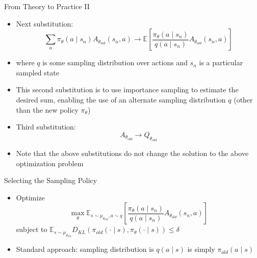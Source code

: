 \documentclass[aspectratio=169]{../latex_main/tntbeamer}  %
\begin{document}
\begin{frame}[c]{From Theory to Practice II}
	
    \begin{itemize}
        \item Next substitution:
        $$\sum_{a} \pi_\theta (a\mid s_n) A_{\theta_{old}} (s_n, a) \to \mathbb{E}\left[ \frac{\pi_\theta(a \mid s_n)}{q(a\mid s_n)} A_{\theta_{old}} (s_n, a) \right] $$
        \item where $q$ is some sampling distribution over actions and $s_n$ is a particular sampled state
        \item This second substitution is to use \alert{importance sampling} to estimate the desired sum, enabling the use of an alternate sampling distribution $q$ (other than the new policy $\pi_\theta$)
        \pause
        \item Third substitution:
        $$ A_{\theta_{old}} \to Q_{\theta_{old}}$$
        \item Note that the above substitutions do not change the solution to the above optimization problem
    \end{itemize}

\end{frame}
\begin{frame}[c]{Selecting the Sampling Policy}
	
    \begin{itemize}
        \item Optimize
        $$ \max_\theta \mathbb{E}_{s\sim \mu_{\theta_{old}}, a \sim q} \left[ \frac{\pi_\theta(a \mid s_n)}{q(a\mid s_n)} A_{\theta_{old}} (s_n, a) \right]$$
        {\centering subject to $\mathbb{E}_{s\sim \mu_{\theta_{old}}} D_{KL}(\pi_{old}(\cdot \mid s), \pi_\theta (\cdot \mid s)) \leq \delta$ \\}
        \item Standard approach: sampling distribution is $q(a\mid s)$ is simply $\pi_{old}(a \mid s)$
    \end{itemize}
    

\end{frame}
\end{document}
